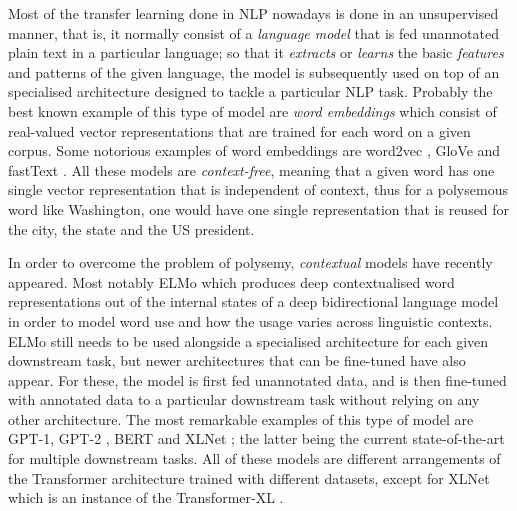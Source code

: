 Most of the transfer learning done in NLP nowadays is done in an unsupervised manner, that is, it normally consist of a  \emph{language model} that is fed unannotated plain text in a particular language; so that it \emph{extracts} or \emph{learns} the basic \emph{features} and patterns of the given language, the model is subsequently used on top of an specialised architecture designed to tackle a particular NLP task. Probably the best known example of this type of model are \emph{word embeddings} which consist of real-valued vector representations that are trained for each word on a given corpus. Some notorious examples of word embeddings are word2vec \citep{mikolov-etal-2013-distributed}, GloVe \citep{pennington-etal-2014-glove} and \mbox{fastText} \citep{mikolov-etal-2018-advances}. All these models are \emph{context-free}, meaning that a given word has one single vector representation that is independent of context, thus for a polysemous word like Washington, one would have one single representation that is reused for the city, the state and the US president.

In order to overcome the problem of polysemy, \emph{contextual} models have recently appeared. Most notably ELMo \citep{peters-etal-2018-deep} which produces deep contextualised word representations out of the internal states of a deep bidirectional language model in order to model word use and how the usage varies across linguistic contexts. ELMo still needs to be used alongside a specialised architecture for each given downstream task, but newer architectures that can be fine-tuned have also appear. For these, the model is first fed unannotated data, and is then fine-tuned with annotated data to a particular downstream task without relying on any other architecture. The most remarkable examples of this type of model are GPT-1, GPT-2 \citep{radford-etal-2018-improving,radford-etal-2019-language}, BERT \citep{devlin-etal-2019-bert} and XLNet \citep{yang-etal-2019-xlnet}; the latter being the current state-of-the-art for multiple downstream tasks. All of these models are different arrangements of the Transformer architecture \citep{vaswani-etal-2017-attention} trained with different datasets, except for XLNet which is an instance of the Transformer-XL \citep{dai-etal-2019-transformer}.


